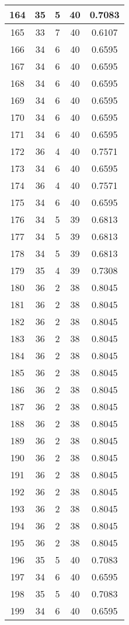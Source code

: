 \documentclass[letterpaper, 12pt]{article}
\begin{document}
\begin{longtable}{|c|c|c|c|c|}
\hline
164 & 35 & 5 & 40 & 0.7083 \\
\hline
165 & 33 & 7 & 40 & 0.6107 \\
\hline
166 & 34 & 6 & 40 & 0.6595 \\
\hline
167 & 34 & 6 & 40 & 0.6595 \\
\hline
168 & 34 & 6 & 40 & 0.6595 \\
\hline
169 & 34 & 6 & 40 & 0.6595 \\
\hline
170 & 34 & 6 & 40 & 0.6595 \\
\hline
171 & 34 & 6 & 40 & 0.6595 \\
\hline
172 & 36 & 4 & 40 & 0.7571 \\
\hline
173 & 34 & 6 & 40 & 0.6595 \\
\hline
174 & 36 & 4 & 40 & 0.7571 \\
\hline
175 & 34 & 6 & 40 & 0.6595 \\
\hline
176 & 34 & 5 & 39 & 0.6813 \\
\hline
177 & 34 & 5 & 39 & 0.6813 \\
\hline
178 & 34 & 5 & 39 & 0.6813 \\
\hline
179 & 35 & 4 & 39 & 0.7308 \\
\hline
180 & 36 & 2 & 38 & 0.8045 \\
\hline
181 & 36 & 2 & 38 & 0.8045 \\
\hline
182 & 36 & 2 & 38 & 0.8045 \\
\hline
183 & 36 & 2 & 38 & 0.8045 \\
\hline
184 & 36 & 2 & 38 & 0.8045 \\
\hline
185 & 36 & 2 & 38 & 0.8045 \\
\hline
186 & 36 & 2 & 38 & 0.8045 \\
\hline
187 & 36 & 2 & 38 & 0.8045 \\
\hline
188 & 36 & 2 & 38 & 0.8045 \\
\hline
189 & 36 & 2 & 38 & 0.8045 \\
\hline
190 & 36 & 2 & 38 & 0.8045 \\
\hline
191 & 36 & 2 & 38 & 0.8045 \\
\hline
192 & 36 & 2 & 38 & 0.8045 \\
\hline
193 & 36 & 2 & 38 & 0.8045 \\
\hline
194 & 36 & 2 & 38 & 0.8045 \\
\hline
195 & 36 & 2 & 38 & 0.8045 \\
\hline
196 & 35 & 5 & 40 & 0.7083 \\
\hline
197 & 34 & 6 & 40 & 0.6595 \\
\hline
198 & 35 & 5 & 40 & 0.7083 \\
\hline
199 & 34 & 6 & 40 & 0.6595 \\
\hline
\end{longtable}
\end{document}
